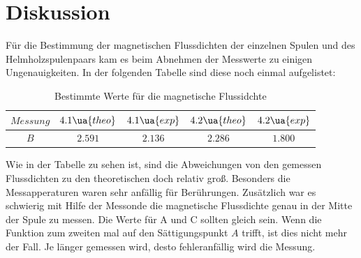 \section{Diskussion}
Für die Bestimmung der magnetischen Flussdichten der einzelnen Spulen und des Helmholzspulenpaars
kam es beim Abnehmen der Messwerte zu einigen Ungenauigkeiten. In der folgenden Tabelle sind diese
noch einmal aufgelistet:
\begin{table}
  \centering
  \caption{Bestimmte Werte für die magnetische Flussidchte}
  \label{tab:Zusammenfassung}
  \begin{tabular}{c | c c c c}
    \toprule  $Messung$ & $4.1\ua{theo}$ & $4.1\ua{exp}$ & $4.2\ua{theo}$ & $4.2\ua{exp}$\\
    \midrule  $B$ & $2.591$ & $2.136$ &
              $2.286$ & $1.800$\\
    \bottomrule
  \end{tabular}
\end{table}

Wie in der Tabelle zu sehen ist, sind die Abweichungen von den gemessen Flussdichten zu den
theoretischen doch relativ groß. Besonders die Messapperaturen waren sehr anfällig für Berührungen. Zusätzlich war es schwierig mit Hilfe der Messonde die magnetische
Flussdichte genau in der Mitte der Spule zu messen.
Die Werte für A und C sollten gleich sein.
Wenn die Funktion zum zweiten mal auf den Sättigungspunkt $A$ trifft, ist dies nicht mehr der Fall.
Je länger gemessen wird, desto fehleranfällig wird die Messung.

